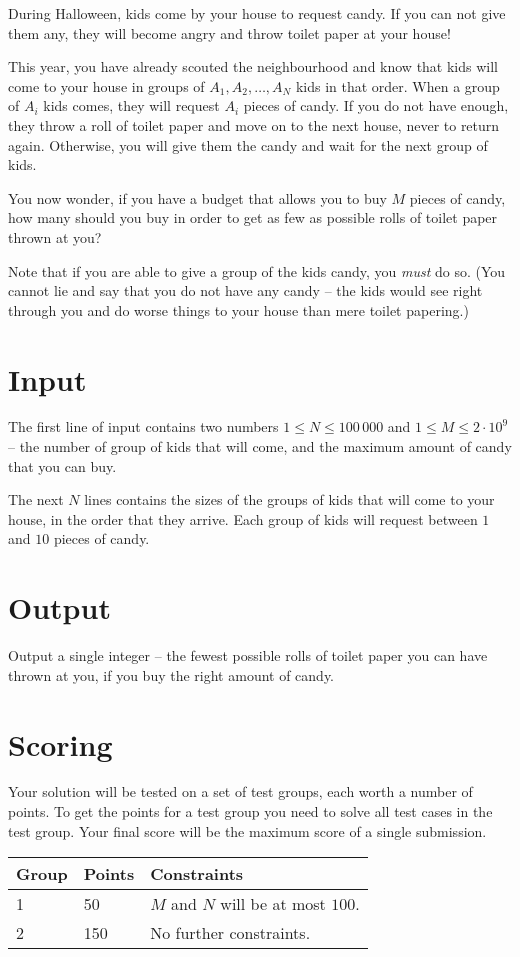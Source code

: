 During Halloween, kids come by your house to request candy.
If you can not give them any, they will become angry and throw toilet paper at your house!

This year, you have already scouted the neighbourhood and know that kids will come to your house in groups of $A_1, A_2, \dots, A_N$ kids in that order.
When a group of $A_i$ kids comes, they will request $A_i$ pieces of candy.
If you do not have enough, they throw a roll of toilet paper and move on to the next house, never to return again.
Otherwise, you will give them the candy and wait for the next group of kids.

You now wonder, if you have a budget that allows you to buy $M$ pieces of candy, how many should you buy in order to get as few as possible rolls of toilet paper thrown at you?

Note that if you are able to give a group of the kids candy, you \emph{must} do so.
(You cannot lie and say that you do not have any candy -- the kids would see right through you and do worse things to your house than mere toilet papering.)

\section*{Input}
The first line of input contains two numbers $1 \le N \le 100\,000$ and $1 \le M \le 2 \cdot 10^9$ -- the number of group of kids that will come, and the maximum amount of candy that you can buy.

The next $N$ lines contains the sizes of the groups of kids that will come to your house, in the order that they arrive.
Each group of kids will request between $1$ and $10$ pieces of candy.

\section*{Output}
Output a single integer -- the fewest possible rolls of toilet paper you can have thrown at you, if you buy the right amount of candy.

\section*{Scoring}
Your solution will be tested on a set of test groups, each worth a number of points.
To get the points for a test group you need to solve all test cases in the test group.
Your final score will be the maximum score of a single submission.

\noindent
\begin{tabular}{| l | l | l |}
\hline
Group & Points & Constraints \\ \hline
1     & 50     & $M$ and $N$ will be at most $100$. \\ \hline
2     & 150    & No further constraints. \\ \hline
\end{tabular}
